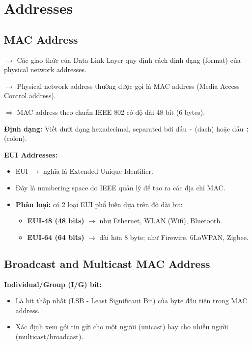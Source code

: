 \section{Addresses}

\subsection{MAC Address}

\noindent
$\rightarrow$ Các giao thức của Data Link Layer quy định cách định dạng (format) của physical network addresses.
\medskip

\noindent
$\rightarrow$ Physical network address thường được gọi là MAC address (Media Access Control address).
\medskip

$\Rightarrow$ MAC address theo chuẩn IEEE 802 có độ dài 48 bít (6 bytes).
\medskip

\noindent
\textbf{Định dạng:} Viết dưới dạng hexadecimal, separated bởi dấu \texttt{-} (dash) hoặc dấu \texttt{:} (colon).
\medskip

\noindent
\textbf{EUI Addresses:}

\begin{itemize}
    \item EUI $\rightarrow$ nghĩa là Extended Unique Identifier.
    \item[$\rightarrow$] Đây là numbering space do IEEE quản lý để tạo ra các địa chỉ MAC.
    \item \textbf{Phân loại:} có 2 loại EUI phổ biến dựa trên độ dài bit: \begin{itemize}
        \item \textbf{EUI-48 (48 bits)} $\rightarrow$ như Ethernet, WLAN (Wifi), Bluetooth.
        \item \textbf{EUI-64 (64 bits)} $\rightarrow$ dài hơn 8 byte; như Firewire, 6LoWPAN, Zigbee.
    \end{itemize}
\end{itemize}
\medskip

\subsection{Broadcast and Multicast MAC Address}

\noindent
\textbf{Individual/Group (I/G) bit:}

\begin{itemize}
    \item[$\rightarrow$] Là bit thấp nhất (LSB - Least Significant Bit) của byte đầu tiên trong MAC address.
    \item[$\Rightarrow$] Xác định xem gói tin gửi cho một người (unicast) hay cho nhiều người (multicast/broadcast).
\end{itemize}
\medskip

